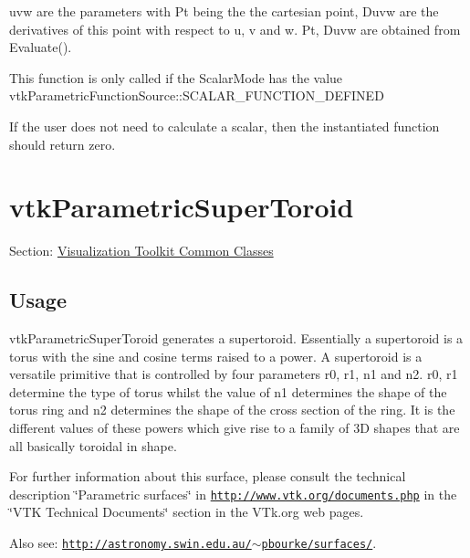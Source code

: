 \begin{DoxyItemize}
uvw are the parameters with Pt being the the cartesian point, Duvw are the derivatives of this point with respect to u, v and w. Pt, Duvw are obtained from Evaluate().

This function is only called if the Scalar\-Mode has the value vtk\-Parametric\-Function\-Source\-::\-S\-C\-A\-L\-A\-R\-\_\-\-F\-U\-N\-C\-T\-I\-O\-N\-\_\-\-D\-E\-F\-I\-N\-E\-D

If the user does not need to calculate a scalar, then the instantiated function should return zero.


\end{DoxyItemize}\hypertarget{vtkcommon_vtkparametricsupertoroid}{}\section{vtk\-Parametric\-Super\-Toroid}\label{vtkcommon_vtkparametricsupertoroid}
Section\-: \hyperlink{sec_vtkcommon}{Visualization Toolkit Common Classes} \hypertarget{vtkwidgets_vtkxyplotwidget_Usage}{}\subsection{Usage}\label{vtkwidgets_vtkxyplotwidget_Usage}
vtk\-Parametric\-Super\-Toroid generates a supertoroid. Essentially a supertoroid is a torus with the sine and cosine terms raised to a power. A supertoroid is a versatile primitive that is controlled by four parameters r0, r1, n1 and n2. r0, r1 determine the type of torus whilst the value of n1 determines the shape of the torus ring and n2 determines the shape of the cross section of the ring. It is the different values of these powers which give rise to a family of 3\-D shapes that are all basically toroidal in shape.

For further information about this surface, please consult the technical description \char`\"{}\-Parametric surfaces\char`\"{} in \href{http://www.vtk.org/documents.php}{\tt http\-://www.\-vtk.\-org/documents.\-php} in the \char`\"{}\-V\-T\-K Technical Documents\char`\"{} section in the V\-Tk.\-org web pages.

Also see\-: \href{http://astronomy.swin.edu.au/~pbourke/surfaces/}{\tt http\-://astronomy.\-swin.\-edu.\-au/$\sim$pbourke/surfaces/}.

